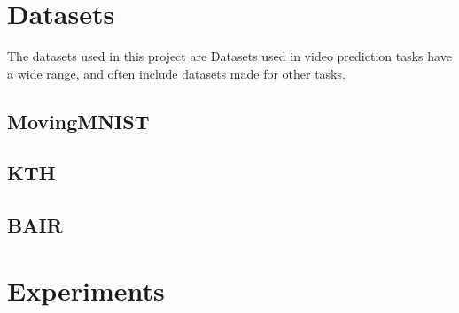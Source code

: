 \documentclass{scrartcl}
\begin{document}

%
%
%

\newpage
\section{Datasets}
\label{sec:datasets}

The datasets used in this project are 
Datasets used in video prediction tasks have a wide range, and often include datasets made for other tasks.

\subsection{MovingMNIST}
\label{subsec:mmnist}

\subsection{KTH}
\label{subsec:kth}

\subsection{BAIR}
\label{subsec:bair}

\newpage
\section{Experiments}
\label{sec:experiments}
\end{document}
